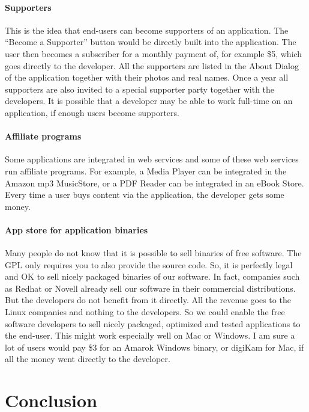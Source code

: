 \paragraph*{Supporters}

This is the idea that end-users can become supporters of an application. The
``Become a Supporter'' button would be directly built into the application. The
user then becomes a subscriber for a monthly payment of, for example \$5, which
goes directly to the developer. All the supporters are listed in the About
Dialog of the application together with their photos and real names. Once a year
all supporters are also invited to a special supporter party together with the
developers. It is possible that a developer may be able to work full-time on an
application, if enough users become supporters.

\paragraph*{Affiliate programs}

Some applications are integrated in web services and some of these web services
run affiliate programs. For example, a Media Player can be integrated in the
Amazon mp3 MusicStore, or a PDF Reader can be integrated in an eBook Store.
Every time a user buys content via the application, the developer gets some
money.

\paragraph*{App store for application binaries}

Many people do not know that it is possible to sell binaries of free software.
The GPL only requires you to also provide the source code. So, it is perfectly
legal and OK to sell nicely packaged binaries of our software. In fact,
companies such as Redhat or Novell already sell our software in their commercial
distributions. But the developers do not benefit from it directly. All the
revenue goes to the Linux companies and nothing to the developers. So we could
enable the free software developers to sell nicely packaged, optimized and
tested applications to the end-user. This might work especially well on Mac or
Windows. I am sure a lot of users would pay \$3 for an Amarok Windows binary, or
digiKam for Mac, if all the money went directly to the developer.

\section*{Conclusion}

